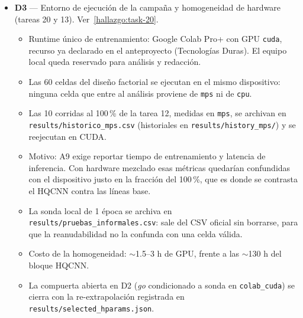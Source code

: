 \documentclass[12pt,letterpaper]{article}
\begin{document}
\begin{itemize}
\begin{itemize}
        \item Historiales por $L$ en \texttt{results/history/} con sufijo \texttt{\_L\{n\}}.
    \end{itemize}
    \item \textbf{D3} --- Entorno de ejecución de la campaña y homogeneidad de hardware (tareas 20 y 13).
    Ver~\ref{hallazgo:task-20}.
    \begin{itemize}
        \item Runtime único de entrenamiento: Google Colab Pro+ con GPU \texttt{cuda}, recurso
              ya declarado en el anteproyecto (Tecnologías Duras). El equipo local queda reservado
              para análisis y redacción.
        \item Las 60 celdas del diseño factorial se ejecutan en el mismo dispositivo: ninguna celda
              que entre al análisis proviene de \texttt{mps} ni de \texttt{cpu}.
        \item Las 10 corridas al 100\,\% de la tarea 12, medidas en \texttt{mps}, se archivan en
              \texttt{results/historico\_mps.csv} (historiales en \texttt{results/history\_mps/})
              y se reejecutan en CUDA.
        \item Motivo: A9 exige reportar tiempo de entrenamiento y latencia de inferencia. Con hardware
              mezclado esas métricas quedarían confundidas con el dispositivo justo en la fracción
              del 100\,\%, que es donde se contrasta el HQCNN contra las líneas base.
        \item La sonda local de 1 época se archiva en \texttt{results/pruebas\_informales.csv}: sale del
              CSV oficial sin borrarse, para que la reanudabilidad no la confunda con una celda válida.
        \item Costo de la homogeneidad: $\sim$1.5--3 h de GPU, frente a las $\sim$130 h del bloque HQCNN.
        \item La compuerta abierta en D2 (\textit{go} condicionado a sonda en \texttt{colab\_cuda}) se cierra
              con la re-extrapolación registrada en \texttt{results/selected\_hparams.json}.
    \end{itemize}
\end{itemize}



\end{document}
